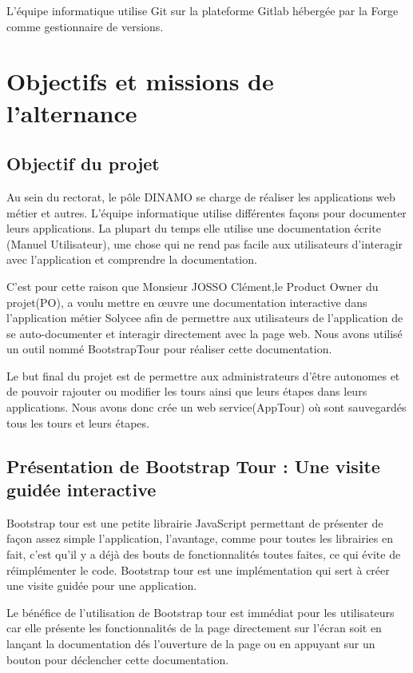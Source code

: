 \documentclass[12pt]{article}
\begin{document}
L'équipe informatique utilise Git sur la plateforme Gitlab hébergée par la Forge comme gestionnaire de versions.


\section{Objectifs et missions de l'alternance}

\subsection{Objectif du projet}

Au sein du rectorat, le pôle DINAMO se charge de réaliser les applications web métier et autres. L'équipe informatique utilise différentes façons pour documenter leurs applications. La plupart du temps elle utilise une documentation écrite (Manuel Utilisateur), une chose qui ne rend pas facile aux utilisateurs d’interagir avec l'application et comprendre la documentation.


C'est pour cette raison que Monsieur JOSSO Clément,le Product Owner du projet(PO), a voulu mettre en œuvre une documentation interactive dans l'application métier Solycee afin de permettre aux utilisateurs de l'application de se auto-documenter et interagir directement avec la page web. Nous avons utilisé un outil nommé BootstrapTour pour réaliser cette documentation.

Le but final du projet est de permettre aux administrateurs d'être autonomes et de pouvoir rajouter ou modifier les tours ainsi que leurs  étapes dans leurs applications. Nous avons donc crée un web service(AppTour) où sont sauvegardés tous les tours et leurs étapes.

\subsection{Présentation de Bootstrap Tour : Une visite guidée interactive}

Bootstrap tour est une petite librairie JavaScript permettant de présenter de façon assez simple l’application, l’avantage, comme pour toutes les librairies en fait, c’est qu’il y a déjà des bouts de fonctionnalités toutes faites, ce qui évite de réimplémenter le code. Bootstrap tour est une implémentation qui sert à créer une visite guidée pour une application.

Le bénéfice de l'utilisation de Bootstrap tour est immédiat pour les utilisateurs car elle présente les fonctionnalités de la page directement sur l'écran soit en lançant la documentation  dés l'ouverture de la page ou en appuyant sur un bouton pour déclencher cette documentation.
\end{document}
